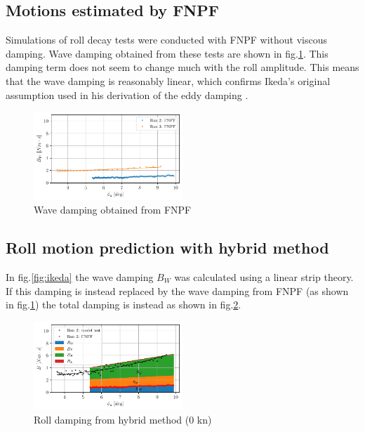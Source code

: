     \subsection*{Motions estimated by FNPF}\label{motions-estimated-by-fnpf}

Simulations of roll decay tests were conducted with FNPF without viscous
damping. Wave damping obtained from these tests are shown in
fig.\ref{fig:fnpf}. This damping term does not seem to change
much with the roll amplitude. This means that the wave damping is
reasonably linear, which confirms Ikeda's original assumption used in
his derivation of the eddy damping \citep{7505983/4AFVVGNT}.

    

    \begin{figure}[H]
        \begin{center}\includegraphics[width = 0.5\textwidth]{figures/fnpf.pdf}\end{center}
        \vspace{-1cm}
        \caption{Wave damping obtained from FNPF}
        \label{fig:fnpf}
    \end{figure}
    
    \subsection*{Roll motion prediction with hybrid
method}\label{roll-motion-prediction-with-hybrid-method}

    In fig.\ref{fig:ikeda} the wave damping $B_W$ was calculated
using a linear strip theory. If this damping is instead replaced by the
wave damping from FNPF (as shown in fig.\ref{fig:fnpf}) the
total damping is instead as shown in fig.\ref{fig:hybrid_0}.

    

    \begin{figure}[H]
        \begin{center}\includegraphics[width = 0.5\textwidth]{figures/hybrid_0.pdf}\end{center}
        \vspace{-1cm}
        \caption{Roll damping from hybrid method (0 kn)}
        \label{fig:hybrid_0}
    \end{figure}
    
